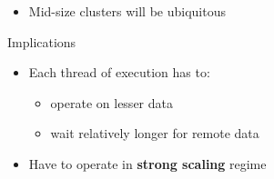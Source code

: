 \begin{frame}[shrink]
  \begin{itemize}
    \item Mid-size clusters will be ubiquitous 
  \end{itemize}

    \pause
    \begin{block}{Implications}
        \begin{itemize}
            \item Each thread of execution has to:
                \begin{itemize}
                    \item operate on lesser data
                    \item wait relatively longer for remote data
                \end{itemize}
            \item Have to operate in \textbf{strong scaling} regime
        \end{itemize}
    \end{block}
\end{frame}

